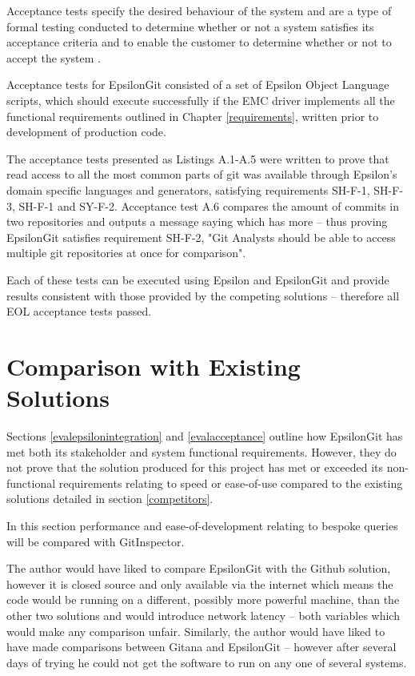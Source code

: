 \documentclass[11pt]{book}
\begin{document}
Acceptance tests specify the desired behaviour of the system and are a type of formal testing conducted to determine whether or not a system satisfies its acceptance criteria and to enable the customer to determine whether or not to accept the system \cite{acceptancetests1}\cite{acceptancetests2}. 

Acceptance tests for EpsilonGit consisted of a set of Epsilon Object Language scripts, which should execute successfully if the EMC driver implements all the functional requirements outlined in Chapter \ref{requirements}, written prior to development of production code. 

The acceptance tests presented as Listings A.1-A.5 were written to prove that read access to all the most common parts of git was available through Epsilon's domain specific languages and generators, satisfying requirements SH-F-1, SH-F-3, SH-F-1 and SY-F-2. Acceptance test A.6 compares the amount of commits in two repositories and outputs a message saying which has more -- thus proving EpsilonGit satisfies requirement SH-F-2, "Git Analysts should be able to access multiple git repositories at once for comparison".

Each of these tests can be executed using Epsilon and EpsilonGit and provide results consistent with those provided by the competing solutions -- therefore all EOL acceptance tests passed.

\section{Comparison with Existing Solutions}
Sections \ref{evalepsilonintegration} and \ref{evalacceptance} outline how EpsilonGit has met both its stakeholder and system functional requirements. However, they do not prove that the solution produced for this project has met or exceeded its non-functional requirements relating to speed or ease-of-use compared to the existing solutions detailed in section \ref{competitors}.

In this section performance and ease-of-development relating to bespoke queries will be compared with GitInspector. 

The author would have liked to compare EpsilonGit with the Github solution, however it is closed source and only available via the internet which means the code would be running on a different, possibly more powerful machine, than the other two solutions and would introduce network latency -- both variables which would make any comparison unfair. Similarly, the author would have liked to have made comparisons between Gitana and EpsilonGit -- however after several days of trying he could not get the software to run on any one of several systems.
\end{document}
